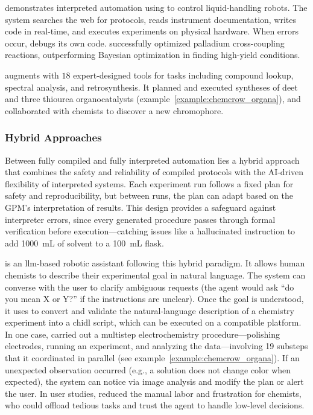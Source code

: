 \autocite{boiko2023autonomous} demonstrates interpreted automation using  to control liquid-handling robots. The system searches the web for protocols, reads instrument documentation, writes  code in real-time, and executes experiments on physical hardware. When errors occur,  debugs its own code.  successfully optimized palladium cross-coupling reactions, outperforming Bayesian optimization in finding high-yield conditions.

\autocite{bran2024augmenting} augments  with $18$ expert-designed tools for tasks including compound lookup, spectral analysis, and retrosynthesis. It planned and executed syntheses of \gls{deet} and three thiourea organocatalysts (example~\ref{example:chemcrow_organa}), and collaborated with chemists to discover a new chromophore.


\subsubsection{Hybrid Approaches}
Between fully compiled and fully interpreted automation lies a hybrid approach that combines the safety and reliability of compiled protocols with the AI-driven flexibility of interpreted systems. Each experiment run follows a fixed plan for safety and reproducibility, but between runs, the plan can adapt based on the GPM’s interpretation of results. This design provides a safeguard against interpreter errors, since every generated procedure passes through formal verification before execution---catching issues like a hallucinated instruction to add \SI{1000}{\milli\liter} of solvent to a \SI{100}{\milli\liter} flask.


 \autocite{darvish2025organa} is an \gls{llm}-based robotic assistant following this hybrid paradigm. 
It allows human chemists to describe their experimental goal in natural language. The system can converse with the user to clarify ambiguous requests (the agent would ask \enquote{do you mean X or Y?} if the instructions are unclear). Once the goal is understood, it uses  \autocite{Yoshikawa2023CLAIRify} to convert and validate the natural-language description of a chemistry experiment into a \gls{chidl} script, which can be executed on a compatible platform. 
In one case,  carried out a multistep electrochemistry procedure---polishing electrodes, running an experiment, and analyzing the data---involving 19 substeps that it coordinated in parallel (see example~\ref{example:chemcrow_organa}).
If an unexpected observation occurred (e.g., a solution does not change color when expected), the system can notice via image analysis and modify the plan or alert the user. 
In user studies,  reduced the manual labor and frustration for chemists, who could offload tedious tasks and trust the agent to handle low-level decisions.



